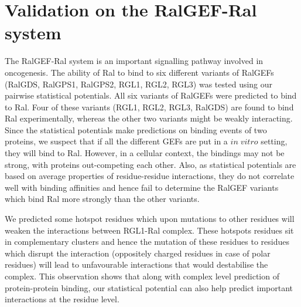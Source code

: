\section{Validation on the RalGEF-Ral system}
The RalGEF-Ral system is an important signalling pathway involved in oncogenesis. The ability of Ral to bind to six different variants of RalGEFs (RalGDS, RalGPS1, RalGPS2, RGL1, RGL2, RGL3) was tested using our pairwise statistical potentials. All six variants of RalGEFs were predicted to bind to Ral. Four of these variants (RGL1, RGL2, RGL3, RalGDS) are found to bind Ral experimentally, whereas the other two variants might be weakly interacting. Since the statistical potentials make predictions on binding events of two proteins, we suspect that if all the different GEFs are put in a $in \; vitro$ setting, they will bind to Ral. However, in a cellular context, the bindings may not be strong, with proteins out-competing each other. Also, as statistical potentials are based on average properties of residue-residue interactions, they do not correlate well with binding affinities and hence fail to determine the RalGEF variants which bind Ral more strongly than the other variants.

\par 
We predicted some hotspot residues which upon mutations to other residues will weaken the interactions between RGL1-Ral complex. These hotspots residues sit in complementary clusters and hence the mutation of these residues to residues which disrupt the interaction (oppositely charged residues in case of polar residues) will lead to unfavourable interactions that would destabilise the complex. This observation shows that  along with complex level prediction of protein-protein binding, our statistical potential can also help predict important interactions at the residue level.


